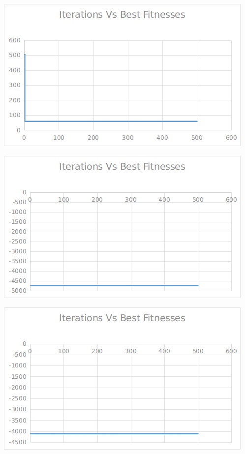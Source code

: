 \documentclass[12pt]{article}
\begin{document}
					\begin{minipage}{0.6\linewidth}
						\includegraphics[width=\linewidth]{27.png}
					\end{minipage}
					\hfill
					\begin{minipage}{0.6\linewidth}
						\includegraphics[width=\linewidth]{28.png}
					\end{minipage}
					\begin{minipage}{0.6\linewidth}
						\includegraphics[width=\linewidth]{29.png}
					\end{minipage}
\end{document}
